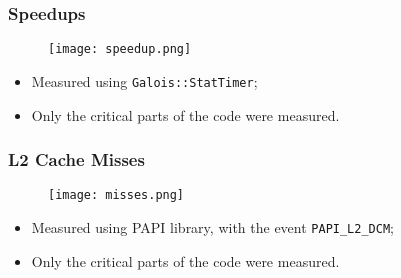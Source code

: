 \begin{frame}
	\frametitle{Speedups}
	\begin{figure}
		\texttt{[image: speedup.png]}
	\end{figure}

	\begin{itemize}
		\item Measured using \texttt{Galois::StatTimer};
		\item Only the critical parts of the code were measured.
	\end{itemize}
\end{frame}

\begin{frame}
	\frametitle{L2 Cache Misses}
	\begin{figure}
		\texttt{[image: misses.png]}
	\end{figure}
	\begin{itemize}
		\item Measured using PAPI library, with the event \texttt{PAPI\_L2\_DCM};
		\item Only the critical parts of the code were measured.
	\end{itemize}
\end{frame}